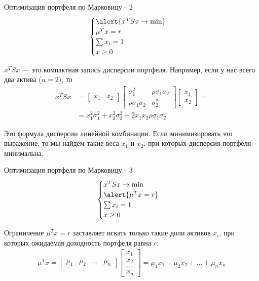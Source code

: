 \documentclass{beamer}
\begin{document}
\begin{frame}{Оптимизация портфеля по Марковицу - 2}
\begin{align*}
\begin{cases}
\alert{x^TS x \to \min} \\
\mu^Tx = r \\
\sum x_i = 1 \\
x \ge 0
\end{cases}
\end{align*}

\justify
$x^TSx$ --- это компактная запись дисперсии портфеля. Например, если у нас 
всего два актива ($n=2$), то
\begin{align*}
x^TSx &=
\begin{bmatrix}x_1 & x_2\end{bmatrix}
\begin{bmatrix}\sigma_1^2 & \rho\sigma_1\sigma_2 \\
\rho\sigma_1\sigma_2 & \sigma_2^2\end{bmatrix}
\begin{bmatrix}
x_1 \\ x_2
\end{bmatrix} = \\
&= x_1^2\sigma_1^2 + x_2^2\sigma_2^2 + 2x_1x_2\rho\sigma_1\sigma_2
\end{align*}

\justify
Это формула дисперсии линейной комбинации. Если минимизировать это выражение, 
то мы найдём такие веса $x_1$ и $x_2$, при которых дисперсия портфеля 
минимальна. 
\end{frame}



\begin{frame}{Оптимизация портфеля по Марковицу - 3}
\begin{align*}
\begin{cases}
x^TS x \to \min \\
\alert{\mu^Tx = r} \\
\sum x_i = 1 \\
x \ge 0
\end{cases}
\end{align*}

\justify
Ограничение $\mu^Tx = r$ заставляет искать только такие доли активов $x_i$, при 
которых ожидаемая доходность портфеля равна $r$:
\begin{align*}
\mu^Tx =
\begin{bmatrix}
\mu_1 & \mu_2 & ... & \mu_n
\end{bmatrix}
\begin{bmatrix}
x_1 \\ x_2 \\ ... \\ x_n
\end{bmatrix} =
\mu_1 x_1 + \mu_2 x_2 + ... + \mu_n x_n
\end{align*}
\end{frame}
\end{document}
